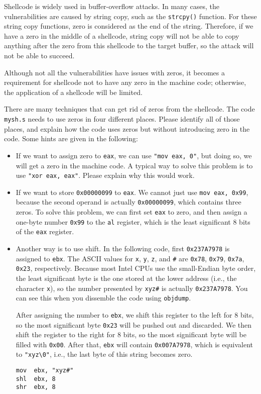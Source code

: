 Shellcode is widely used in buffer-overflow attacks. In many 
cases, the vulnerabilities are caused by string copy, such
as the \texttt{strcpy()} function. For these string copy functions,
zero is considered as the end of the string. Therefore, if we have 
a zero in the middle of a shellcode, string copy will not be able to
copy anything after the zero from this shellcode to the target 
buffer, so the attack will not be able to succeed. 

Although not all the vulnerabilities have issues with zeros, 
it becomes a requirement for shellcode not to have any zero in
the machine code; otherwise, the application of a shellcode 
will be limited. 

There are many techniques that can get rid of zeros 
from the shellcode. The code \texttt{mysh.s} needs to 
use zeros in four different places. Please identify all
of those places, and explain how the code uses zeros
but without introducing zero in the code. Some hints 
are given in the following:


\begin{itemize}
\item If we want to assign zero to \texttt{eax}, we 
can use \texttt{"mov eax, 0"}, but doing so,
we will get a zero in the machine code. A typical way
to solve this problem is to use \texttt{"xor eax, eax"}. 
Please explain why this would work.

\item If we want to store \texttt{0x00000099} to
\texttt{eax}. We cannot just use \texttt{mov eax, 0x99}, because 
the second operand is actually \texttt{0x00000099}, which contains three zeros. 
To solve this problem, we can first set \texttt{eax} to zero, and then
assign a one-byte number \texttt{0x99} to the \texttt{al} register, which 
is the least significant 8 bits of the \texttt{eax} register. 


\item Another way is to use shift. In the following code,
first \texttt{0x237A7978} is assigned to \texttt{ebx}.
The ASCII values for \texttt{x}, \texttt{y}, \texttt{z}, and \texttt{\#} are 
\texttt{0x78}, \texttt{0x79}, \texttt{0x7a}, \texttt{0x23}, 
respectively. Because most Intel CPUs use the small-Endian byte order,
the least significant byte is the one stored at the lower address (i.e., the
character \texttt{x}), so the number presented by \texttt{xyz\#} is 
actually \texttt{0x237A7978}. You can see this when you dissemble the 
code using \texttt{objdump}. 

After assigning the number to \texttt{ebx},  
we shift this register to the left 
for 8 bits, so the most significant byte \texttt{0x23} will 
be pushed out and discarded. 
We then shift the register to the right for 8 bits,
so the most significant byte will be filled with \texttt{0x00}. 
After that, \texttt{ebx} will contain \texttt{0x007A7978}, 
which is equivalent to \texttt{"xyz\textbackslash 0"}, i.e., the last
byte of this string becomes zero. 

\begin{lstlisting}
mov  ebx, "xyz#"
shl  ebx, 8
shr  ebx, 8
\end{lstlisting}
\end{itemize}


